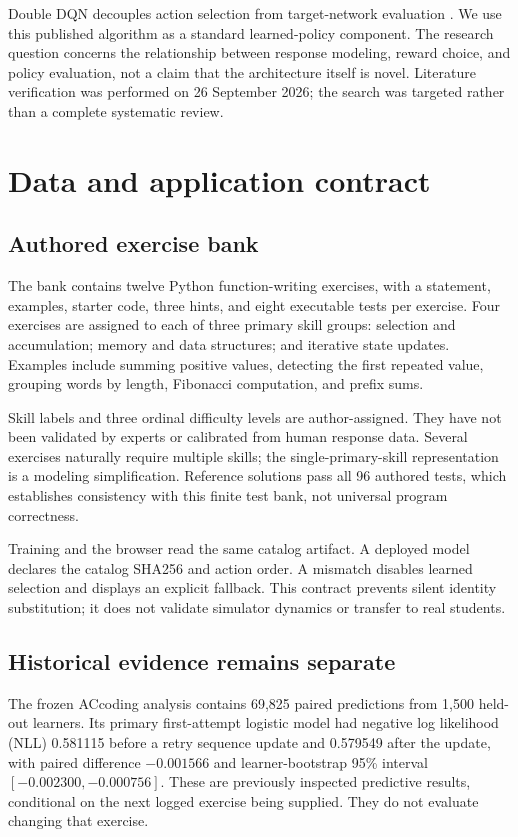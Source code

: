 \documentclass[11pt,a4paper]{article}
\begin{document}
Double DQN decouples action selection from target-network evaluation \cite{ddqn}. We use this published algorithm as a standard learned-policy component. The research question concerns the relationship between response modeling, reward choice, and policy evaluation, not a claim that the architecture itself is novel. Literature verification was performed on 26 September 2026; the search was targeted rather than a complete systematic review.

\section{Data and application contract}
\subsection{Authored exercise bank}
The bank contains twelve Python function-writing exercises, with a statement, examples, starter code, three hints, and eight executable tests per exercise. Four exercises are assigned to each of three primary skill groups: selection and accumulation; memory and data structures; and iterative state updates. Examples include summing positive values, detecting the first repeated value, grouping words by length, Fibonacci computation, and prefix sums.

Skill labels and three ordinal difficulty levels are author-assigned. They have not been validated by experts or calibrated from human response data. Several exercises naturally require multiple skills; the single-primary-skill representation is a modeling simplification. Reference solutions pass all 96 authored tests, which establishes consistency with this finite test bank, not universal program correctness.

Training and the browser read the same catalog artifact. A deployed model declares the catalog SHA256 and action order. A mismatch disables learned selection and displays an explicit fallback. This contract prevents silent identity substitution; it does not validate simulator dynamics or transfer to real students.

\subsection{Historical evidence remains separate}
The frozen ACcoding analysis contains 69,825 paired predictions from 1,500 held-out learners. Its primary first-attempt logistic model had negative log likelihood (NLL) 0.581115 before a retry sequence update and 0.579549 after the update, with paired difference $-0.001566$ and learner-bootstrap 95\% interval $[-0.002300,-0.000756]$. These are previously inspected predictive results, conditional on the next logged exercise being supplied. They do not evaluate changing that exercise.
\end{document}
